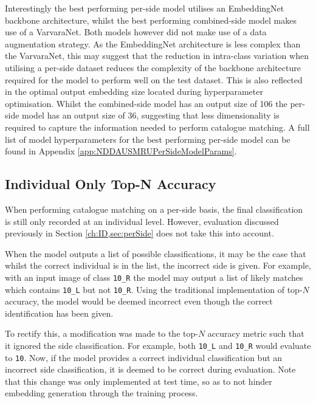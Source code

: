 Interestingly the best performing per-side model utilises an EmbeddingNet backbone architecture, whilst the best performing combined-side model makes use of a VarvaraNet. Both models however did not make use of a data augmentation strategy. As the EmbeddingNet architecture is less complex than the VarvaraNet, this may suggest that the reduction in intra-class variation when utilising a per-side dataset reduces the complexity of the backbone architecture required for the model to perform well on the test dataset. This is also reflected in the optimal output embedding size located during hyperparameter optimisation. Whilst the combined-side model has an output size of 106 the per-side model has an output size of 36, suggesting that less dimensionality is required to capture the information needed to perform catalogue matching. A full list of model hyperparameters for the best performing per-side model can be found in Appendix \ref{app:NDDAUSMRUPerSideModelParams}.

\subsection{Individual Only Top-N Accuracy}\label{ch:ID,sec:perSide,sub:individualOnlyTopN}

When performing catalogue matching on a per-side basis, the final classification is still only recorded at an individual level. However, evaluation discussed previously in Section \ref{ch:ID,sec:perSide} does not take this into account. 

When the model outputs a list of possible classifications, it may be the case that whilst the correct individual is in the list, the incorrect side is given. For example, with an input image of class \texttt{10\_R} the model may output a list of likely matches which contains \texttt{10\_L} but not \texttt{10\_R}. Using the traditional implementation of top-$N$ accuracy, the model would be deemed incorrect even though the correct identification has been given. 

To rectify this, a modification was made to the top-$N$ accuracy metric such that it ignored the side classification. For example, both \texttt{10\_L} and \texttt{10\_R} would evaluate to \texttt{10}. Now, if the model provides a correct individual classification but an incorrect side classification, it is deemed to be correct during evaluation. Note that this change was only implemented at test time, so as to not hinder embedding generation through the training process. 

